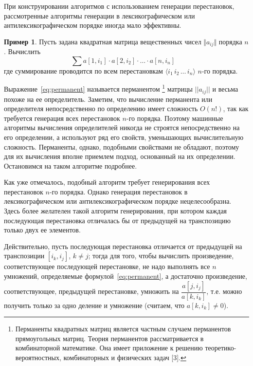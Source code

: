 \documentclass[12pt,a4paper]{article}
\theoremstyle{plain}
\theoremstyle{definition}
\newtheorem*{example}{Пример}
\theoremstyle{remark}
\begin{document}
При конструировании алгоритмов с использованием генерации перестановок, рассмотренные алгоритмы генерации в лексикографическом или антилексикографическом порядке иногда мало эффективны.

\begin{example}
Пусть задана квадратная матрица вещественных чисел $\Vert a_{ij}\Vert$ порядка $n$. Вычислить
\begin{equation}
\label{eq:permanent}
\sum a[1,i_1]\cdot a[2,i_2]\cdot \ldots \cdot a[n,i_n]\quad
\end{equation}
где суммирование проводится по всем перестановкам $\langle i_1\, i_2\, \ldots\, i_n\rangle$ $n$-го порядка.
\end{example}

Выражение~\eqref{eq:permanent} называется перманентом
\footnote{Перманенты квадратных матриц является частным случаем перманентов прямоугольных матриц. Теория перманентов рассматривается в комбинаторной математике. Она имеет приложение к решению теоретико-вероятностных, комбинаторных и физических задач [3].}
матрицы $||a_{ij}||$ и весьма похоже на ее определитель. Заметим, что вычисление перманента или определителя
непосредственно по определению имеет сложность $O(n!)$, так как требуется генерация всех перестановок $n$-го порядка. Поэтому машинные алгоритмы вычисления определителей никогда не строятся непосредственно на его определении, а используют ряд его свойств, уменьшающих вычислительную сложность. Перманенты, однако, подобными свойствами не обладают, поэтому для их вычисления вполне приемлем подход, основанный на их определении. Остановимся на таком алгоритме подробнее.

Как уже отмечалось, подобный алгоритм требует генерирования всех перестановок $n$-го порядка. Однако генерация перестановок в лексикографическом или антилексикографическом порядке нецелесообразна. Здесь более желателен такой алгоритм генерирования, при котором каждая последующая перестановка отличалась бы от предыдущей на транспозицию только двух ее элементов.

Действительно, пусть последующая перестановка отличается от предыдущей на транспозиции $[i_k,i_j]$, $k\ne j$; тогда для того, чтобы вычислить произведение, соответствующее последующей перестановке, не надо выполнять все $n$ умножений, определяемые формулой~\eqref{eq:permanent}, а достаточно произведение, соответствующее, предыдущей перестановке, умножить на $\dfrac{a[j,i_j]}{a[k,i_k]}$, т.е. можно получить только за одно деление и умножение (считаем, что $a[k,i_k]\ne 0$).
\end{document}
